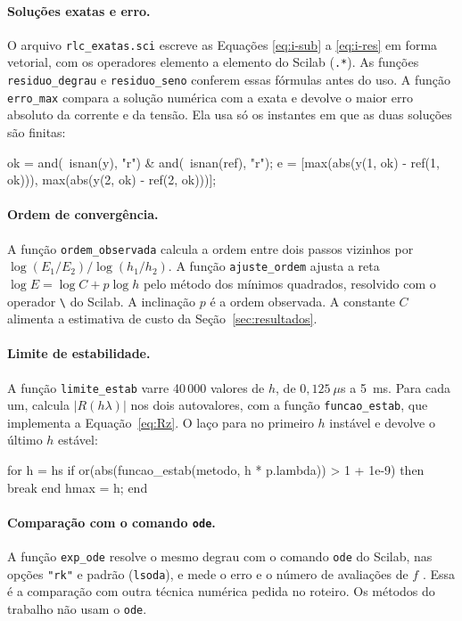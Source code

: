 \paragraph{Soluções exatas e erro.} O arquivo \texttt{rlc\_exatas.sci} escreve as Equações \eqref{eq:i-sub} a \eqref{eq:i-res} em forma vetorial, com os operadores elemento a elemento do Scilab (\texttt{.*}). As funções \texttt{residuo\_degrau} e \texttt{residuo\_seno} conferem essas fórmulas antes do uso. A função \texttt{erro\_max} compara a solução numérica com a exata e devolve o maior erro absoluto da corrente e da tensão. Ela usa só os instantes em que as duas soluções são finitas:
\begin{codigo}
ok = and(~isnan(y), "r") & and(~isnan(ref), "r");
e = [max(abs(y(1, ok) - ref(1, ok))), max(abs(y(2, ok) - ref(2, ok)))];
\end{codigo}

\paragraph{Ordem de convergência.} A função \texttt{ordem\_observada} calcula a ordem entre dois passos vizinhos por \(\log(E_1/E_2)/\log(h_1/h_2)\). A função \texttt{ajuste\_ordem} ajusta a reta \(\log E=\log C+p\log h\) pelo método dos mínimos quadrados, resolvido com o operador \texttt{\textbackslash} do Scilab. A inclinação \(p\) é a ordem observada. A constante \(C\) alimenta a estimativa de custo da Seção~\ref{sec:resultados}.

\paragraph{Limite de estabilidade.} A função \texttt{limite\_estab} varre 40\,000 valores de \(h\), de \(0{,}125~\mu\)s a 5~ms. Para cada um, calcula \(|R(h\lambda)|\) nos dois autovalores, com a função \texttt{funcao\_estab}, que implementa a Equação~\eqref{eq:Rz}. O laço para no primeiro \(h\) instável e devolve o último \(h\) estável:
\begin{codigo}
for h = hs
    if or(abs(funcao_estab(metodo, h * p.lambda)) > 1 + 1e-9) then
        break
    end
    hmax = h;
end
\end{codigo}

\paragraph{Comparação com o comando \texttt{ode}.} A função \texttt{exp\_ode} resolve o mesmo degrau com o comando \texttt{ode} do Scilab, nas opções \texttt{"rk"} e padrão (\texttt{lsoda}), e mede o erro e o número de avaliações de \(f\) \cite[seção~10.7]{aquino2020}. Essa é a comparação com outra técnica numérica pedida no roteiro. Os métodos do trabalho não usam o \texttt{ode}.

